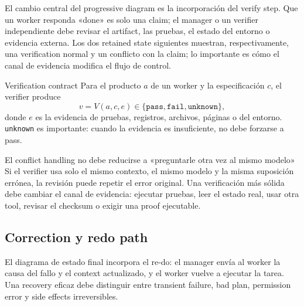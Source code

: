 El cambio central del progressive diagram es la incorporación del verify step. Que un worker responda «done» es solo una claim; el manager o un verifier independiente debe revisar el artifact, las pruebas, el estado del entorno o evidencia externa. Los dos retained state siguientes muestran, respectivamente, una verification normal y un conflicto con la claim; lo importante es cómo el canal de evidencia modifica el flujo de control.


\begin{importantbox}{Verification contract}
Para el producto $a$ de un worker y la especificación $c$, el verifier produce
\[
v=V(a,c,e)\in\{\texttt{pass},\texttt{fail},\texttt{unknown}\},
\]
donde $e$ es la evidencia de pruebas, registros, archivos, páginas o del entorno. \texttt{unknown} es importante: cuando la evidencia es insuficiente, no debe forzarse a pass.
\end{importantbox}


\begin{warningbox}{El conflict handling no debe reducirse a «preguntarle otra vez al mismo modelo»}
Si el verifier usa solo el mismo contexto, el mismo modelo y la misma suposición errónea, la revisión puede repetir el error original. Una verificación más sólida debe cambiar el canal de evidencia: ejecutar pruebas, leer el estado real, usar otra tool, revisar el checksum o exigir una proof ejecutable.
\end{warningbox}

\subsection{Correction y redo path}

El diagrama de estado final incorpora el re-do: el manager envía al worker la causa del fallo y el context actualizado, y el worker vuelve a ejecutar la tarea. Una recovery eficaz debe distinguir entre transient failure, bad plan, permission error y side effects irreversibles.



